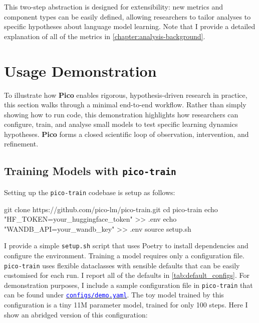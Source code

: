 This two-step abstraction is designed for extensibility: new metrics and component types can be easily defined, allowing researchers to tailor analyses to specific hypotheses about language model learning. Note that I provide a detailed explanation of all of the metrics in \cref{chapter:analysis-background}.

\section{Usage Demonstration} 
\label{sec:usage-demonstration}

To illustrate how \textbf{Pico} enables rigorous, hypothesis-driven research in practice, this section walks through a minimal end-to-end workflow. Rather than simply showing how to run code, this demonstration highlights how researchers can configure, train, and analyse small models to test specific learning dynamics hypotheses. \textbf{Pico} forms a closed scientific loop of observation, intervention, and refinement.

\subsection{Training Models with \texttt{pico-train}}

Setting up the \texttt{pico-train} codebase is setup as follows:

\begin{center}
    \begin{codelisting}
        git clone https://github.com/pico-lm/pico-train.git
        cd pico-train
        echo "HF_TOKEN=your_huggingface_token" >> .env
        echo "WANDB_API=your_wandb_key" >> .env
        source setup.sh
    \end{codelisting}
\end{center}

I provide a simple \verb|setup.sh| script that uses Poetry \citep{poetry} to install dependencies and configure the environment. Training a model requires only a configuration file. \texttt{pico-train} uses flexible dataclasses with sensible defaults that can be easily customised for each run. I report all of the defaults in \cref{tab:default_configs}. For demonstration purposes, I include a sample configuration file in \texttt{pico-train} that can be found under \href{https://github.com/pico-lm/pico-train/blob/main/configs/demo.yaml}{\textcolor{blue}{\texttt{configs/demo.yaml}}}. The toy model trained by this configuration is a tiny 11M parameter model, trained for only 100 steps. Here I show an abridged version of this configuration:


